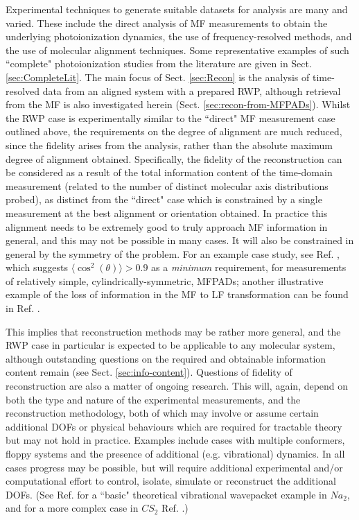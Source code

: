 Experimental techniques to generate suitable datasets for analysis are many and varied. These include the direct analysis of MF measurements to obtain the underlying photoionization dynamics, the use of frequency-resolved methods, and the use of molecular alignment techniques. Some representative examples of such ``complete" photoionization studies from the literature are given in Sect. \ref{sec:CompleteLit}. %
The main focus of Sect. \ref{sec:Recon} is the analysis of time-resolved data from an aligned system with a prepared RWP, although retrieval from the MF is also investigated herein (Sect. \ref{sec:recon-from-MFPADs}). Whilst the RWP case is experimentally similar to the ``direct" MF measurement case outlined above, the requirements on the degree of alignment are much reduced, since the fidelity arises from the analysis, rather than the absolute maximum degree of alignment obtained. Specifically, the fidelity of the reconstruction can be considered as a result of the total information content of the time-domain measurement (related to the number of distinct molecular axis distributions probed), as distinct from the ``direct" case which is constrained by a single measurement at the best alignment or orientation obtained. In practice this alignment needs to be extremely good to truly approach MF information in general, and this may not be possible in many cases. It will also be constrained in general by the symmetry of the problem. For an example case study, see Ref. \cite{reid2018AccessingMolecularFramea}, which suggests $\langle\cos^2(\theta)\rangle>0.9$ as a \textit{minimum} requirement, for measurements of relatively simple, cylindrically-symmetric, MFPADs; another illustrative example of the loss of information in the MF to LF transformation can be found in Ref. \cite{Underwood2000}.

This implies that reconstruction methods may be rather more general, and the RWP case in particular is expected to be applicable to any molecular system, although outstanding questions on the required and obtainable information content remain (see Sect. \ref{sec:info-content}). Questions of fidelity of reconstruction are also a matter of ongoing research. This will, again, depend on both the type and nature of the experimental measurements, and the reconstruction methodology, both of which may involve or assume certain additional DOFs or physical behaviours which are required for tractable theory but may not hold in practice. Examples include cases with multiple conformers, floppy systems and the presence of additional (e.g. vibrational) dynamics. In all cases progress may be possible, but will require additional experimental and/or computational effort to control, isolate, simulate or reconstruct the additional DOFs. (See Ref. \cite{Takatsuka2000} for a ``basic" theoretical vibrational wavepacket example in $Na_2$, and for a more complex case in $CS_2$ Ref. \cite{wang2017MonitoringNonadiabaticDynamics}.)

